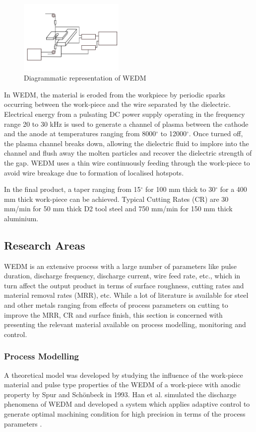 \documentclass[a4paper]{IEEEtran}
\begin{document}
	\begin{figure}
		\centering
		\includegraphics[width=0.45\textwidth]{wedm-diag}
		\caption{Diagrammatic representation of WEDM}
		\label{fig:lit-1}
	\end{figure}

	In WEDM, the material is eroded from the workpiece by periodic sparks occurring between the work-piece and the wire separated by the dielectric. Electrical energy from a pulsating DC power supply operating in the frequency range 20 to 30 kHz is used to generate a channel of plasma between the cathode and the anode at temperatures ranging from 8000$^\circ$ to 12000$^\circ$. Once turned off, the plasma channel breaks down, allowing the dielectric fluid to implore into the channel and flush away the molten particles and recover the dielectric strength of the gap. WEDM uses a thin wire continuously feeding through the work-piece to avoid wire breakage due to formation of localised hotspots.

	In the final product, a taper \cite{ho2004state} ranging from 15$^\circ$ for 100 mm thick to 30$^\circ$ for a 400 mm thick work-piece can be achieved. Typical Cutting Rates (CR) are 30 mm/min for 50 mm thick D2 tool steel and 750 mm/min for 150 mm thick aluminium.

\subsection{Research Areas}
	WEDM is an extensive process with a large number of parameters like pulse duration, discharge frequency, discharge current, wire feed rate, etc., which in turn affect the output product in terms of surface roughness, cutting rates and material removal rates (MRR), etc. While a lot of literature is available for steel and other metals ranging from effects of process parameters on cutting to improve the MRR, CR and surface finish, this section is concerned with presenting the relevant material available on process modelling, monitoring and control.

\subsubsection{Process Modelling}
	A theoretical model was developed by studying the influence of the work-piece material and pulse type properties of the WEDM of a work-piece with anodic property by Spur and Sch{\"o}nbeck \cite{spur1993anode} in 1993. Han et al. simulated the discharge phenomena of WEDM and developed a system which applies adaptive control to generate optimal machining condition for high precision in terms of the process parameters \cite{han2002high}.
\end{document}
